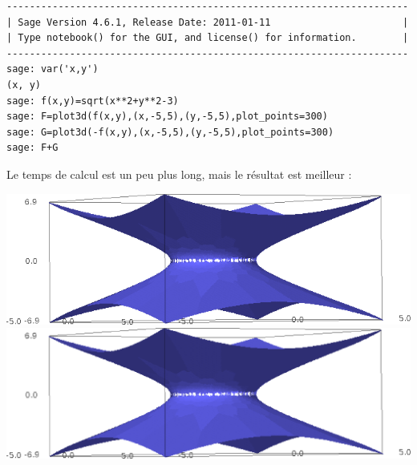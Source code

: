 \begin{example}
    \begin{verbatim}
----------------------------------------------------------------------
| Sage Version 4.6.1, Release Date: 2011-01-11                       |
| Type notebook() for the GUI, and license() for information.        |
----------------------------------------------------------------------
sage: var('x,y')
(x, y)
sage: f(x,y)=sqrt(x**2+y**2-3)
sage: F=plot3d(f(x,y),(x,-5,5),(y,-5,5),plot_points=300) 
sage: G=plot3d(-f(x,y),(x,-5,5),(y,-5,5),plot_points=300)
sage: F+G
    \end{verbatim}
    Le temps de calcul est un peu plus long, mais le résultat est meilleur :
    \begin{center}
        \ifpdf
            \includegraphics[width=15cm]{AdSbon.png}
        \else
            \includegraphics[width=15cm]{AdSbon.eps}
        \fi
    \end{center}
\end{example}




